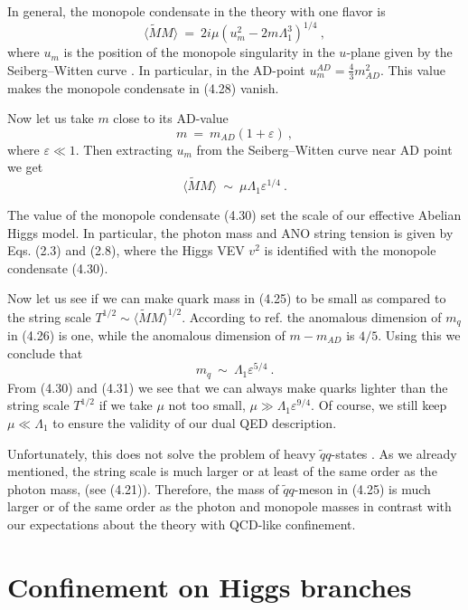 \documentclass[a4paper,12pt]{article}
\begin{document}
In general, the monopole condensate in the theory with one
flavor is \cite{GVY}
\begin{equation}
\langle\widetilde MM\rangle\ =\
2i\mu \left(u^2_m-2m\Lambda^3_1\right)^{1/4}\ ,
\end{equation}
where $u_m$ is the position of the monopole singularity in the
$u$-plane given by the Seiberg--Witten curve \cite{SW2}. In
particular, in the AD-point $u^{AD}_m=\frac43m^2_{AD}$. This
value makes  the monopole condensate in (4.28) vanish.

Now let us take $m$ close to its AD-value
\begin{equation}
m\ =\ m_{AD}(1+\varepsilon)\ ,
\end{equation}
where $\varepsilon\ll1$. Then extracting $u_m$ from the
Seiberg--Witten curve near AD point \cite{GVY} we get
\begin{equation}
\langle\widetilde MM\rangle\ \sim\ \mu \Lambda_1
\varepsilon^{1/4}\ .
\end{equation}

The value of the monopole condensate (4.30) set the scale of our
effective Abelian Higgs model. In particular, the photon mass
and ANO string tension is given by Eqs. (2.3) and (2.8), where
the Higgs VEV  $v^2$ is identified with the monopole condensate (4.30).

Now let us see if we can make quark mass in (4.25) to be small
as compared to the string scale $T^{1/2}\sim\langle\widetilde
MM\rangle^{1/2}$. According to ref.\cite{APSW} the anomalous
dimension of $m_q$ in (4.26) is one, while the anomalous
dimension of $m-m_{AD}$ is $4/5$. Using this we conclude that
\begin{equation}
m_q\ \sim\ \Lambda_1\varepsilon^{5/4}\ .
\end{equation}
From (4.30) and (4.31) we see that we  can always make quarks
lighter than the string scale $T^{1/2}$ if we take $\mu $
not too small, $\mu \gg\Lambda_1\varepsilon^{9/4}$. Of course, we
still keep $\mu \ll\Lambda_1$ to ensure the validity of our
dual QED description.

Unfortunately, this does not solve the problem of heavy
$\tilde qq$-states .
 As we already mentioned, the string scale is much
larger or at least of the same order as  the photon mass,  (see (4.21)).
Therefore, the mass of $\tilde qq$-meson in (4.25) is much larger
 or of the same order
as the photon and  monopole  masses in
contrast with our expectations about the theory with QCD-like
confinement.


\section{Confinement on  Higgs branches}
\setcounter{equation}{0}
\end{document}
